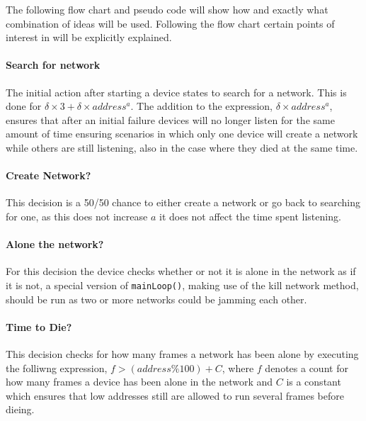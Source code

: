 The following flow chart and pseudo code will show how and exactly what combination of ideas will be used.
Following the flow chart certain points of interest in  will be explicitly explained.

\paragraph{Search for network}
The initial action after starting a device states to search for a network.
This is done for $\delta \times 3 + \delta \times address^a$. 
The addition to the expression, $\delta \times address^a$, ensures that after an initial failure devices will no longer listen for the same amount of time ensuring scenarios in which only one device will create a network while others are still listening, also in the case where they died at the same time.
\paragraph{Create Network?}
This decision is a 50/50 chance to either create a network or go back to searching for one, as this does not increase $a$ it does not affect the time spent listening.
\paragraph{Alone the network?}
For this decision the device checks whether or not it is alone in the network as if it is not, a special version of \texttt{mainLoop()}, making use of the kill network method, should be run as two or more networks could be jamming each other.
\paragraph{Time to Die?}
This decision checks for how many frames a network has been alone by executing the folliwng expression, $f > (address \% 100) + C$, where $f$ denotes a count for how many frames a device has been alone in the network and $C$ is a constant which ensures that low addresses still are allowed to run several frames before dieing.